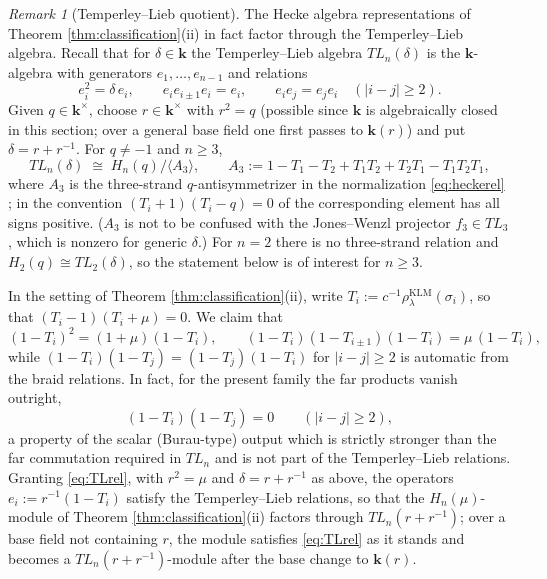 \documentclass[11pt]{article}
\theoremstyle{definition}
\theoremstyle{remark}
\newtheorem{remark}[theorem]{Remark}
\newcommand{\kk}{\boldsymbol{k}}
\newcommand{\rKLM}{\rho^{\mathrm{KLM}}_{\lambda}}
\begin{document}
\begin{remark}[Temperley--Lieb quotient]\label{rem:TL}
The Hecke algebra representations of Theorem
\ref{thm:classification}(ii) in fact factor through the Temperley--Lieb
algebra. Recall that for $\delta \in \kk$ the Temperley--Lieb algebra
$TL_n(\delta)$ is the $\kk$-algebra with generators
$e_1, \dots, e_{n-1}$ and relations
\[
e_i^2 = \delta\, e_i, \qquad
e_i e_{i\pm 1} e_i = e_i, \qquad
e_i e_j = e_j e_i \quad (|i - j| \geq 2).
\]
Given $q \in \kk^{\times}$, choose $r \in \kk^{\times}$ with $r^2 = q$
(possible since $\kk$ is algebraically closed in this section; over a
general base field one first passes to $\kk(r)$) and put
$\delta = r + r^{-1}$. For $q \neq -1$ and $n \geq 3$,
\[
TL_n(\delta) \;\cong\; H_n(q) \big/ \langle A_3 \rangle,
\qquad
A_3 := 1 - T_1 - T_2 + T_1 T_2 + T_2 T_1 - T_1 T_2 T_1,
\]
where $A_3$ is the three-strand $q$-antisymmetrizer in the
normalization \eqref{eq:heckerel} \cite{TemperleyLieb71, Jones87}; in the convention $(T_i + 1)(T_i - q) = 0$ of \cite{Jones87}
the corresponding element has all signs positive. ($A_3$ is not to be
confused with the Jones--Wenzl projector $f_3 \in TL_3$ \cite{Wenzl87},
which is nonzero for generic $\delta$.) For $n = 2$ there is no
three-strand relation and $H_2(q) \cong TL_2(\delta)$, so the statement
below is of interest for $n \geq 3$.

In the setting of Theorem \ref{thm:classification}(ii), write
$T_i := c^{-1}\rKLM(\sigma_i)$, so that $(T_i - 1)(T_i + \mu) = 0$. We
claim that
\begin{equation}\label{eq:TLrel}
(1 - T_i)^2 = (1 + \mu)(1 - T_i), \qquad
(1 - T_i)(1 - T_{i\pm 1})(1 - T_i) = \mu\,(1 - T_i),
\end{equation}
while $(1 - T_i)(1 - T_j) = (1 - T_j)(1 - T_i)$ for $|i - j| \geq 2$ is
automatic from the braid relations. In fact, for the present family
the far products vanish outright,
\begin{equation}\label{eq:farzero}
(1 - T_i)(1 - T_j) = 0 \qquad (|i - j| \geq 2),
\end{equation}
a property of the scalar (Burau-type) output which is strictly stronger
than the far commutation required in $TL_n$ and is not part of the
Temperley--Lieb relations. Granting \eqref{eq:TLrel}, with $r^2 = \mu$ and
$\delta = r + r^{-1}$ as above, the operators
$e_i := r^{-1}(1 - T_i)$ satisfy the Temperley--Lieb relations, so that
the $H_n(\mu)$-module of Theorem \ref{thm:classification}(ii) factors
through $TL_n(r + r^{-1})$; over a base field not containing $r$, the
module satisfies \eqref{eq:TLrel} as it stands and becomes a
$TL_n(r + r^{-1})$-module after the base change to $\kk(r)$.


\end{remark}
\end{document}

